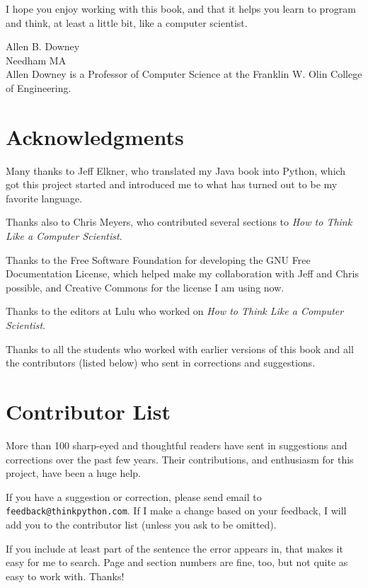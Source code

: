 \documentclass[10pt]{book}
\begin{document}
I hope you enjoy working with this book, and that it helps
you learn to program and think, at least a little bit, like
a computer scientist.


Allen B. Downey \\
Needham MA\\

Allen Downey is a Professor of Computer Science at
the Franklin W. Olin College of Engineering.


\section*{Acknowledgments}

Many thanks to Jeff Elkner, who
translated my Java book into Python, which got this project
started and introduced me to what has turned out to be my
favorite language.

Thanks also to Chris Meyers, who contributed several sections
to {\em How to Think Like a Computer Scientist}.

Thanks to the Free Software Foundation for developing
the GNU Free Documentation License, which helped make
my collaboration with Jeff and Chris possible, and Creative
Commons for the license I am using now.

Thanks to the editors at Lulu who worked on
{\em How to Think Like a Computer Scientist}.

Thanks to all the students who worked with earlier
versions of this book and all the contributors (listed
below) who sent in corrections and suggestions.


\section*{Contributor List}

More than 100 sharp-eyed and thoughtful readers have sent in
suggestions and corrections over the past few years.  Their
contributions, and enthusiasm for this project, have been a
huge help.

If you have a suggestion or correction, please send email to
{\tt feedback@thinkpython.com}.  If I make a change based on your
feedback, I will add you to the contributor list
(unless you ask to be omitted).

If you include at least part of the sentence the
error appears in, that makes it easy for me to search.  Page and
section numbers are fine, too, but not quite as easy to work with.
Thanks!
\end{document}
